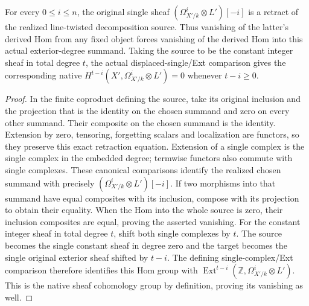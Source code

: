 \begin{lemma}
\label{lem:kn-di-exterior-summand-extraction}
\leanok
{}
For every $0\leq i\leq n$, the original single sheaf
$(\Omega_{X'/k}^i\otimes L')[-i]$ is a retract of the realized
line-twisted decomposition source.  Thus vanishing of the latter's
derived Hom from any fixed object forces vanishing of the derived
Hom into this actual exterior-degree summand.  Taking the source to
be the constant integer sheaf in total degree $t$, the actual
displaced-single/Ext comparison gives the corresponding native
$H^{t-i}(X',\Omega_{X'/k}^i\otimes L')=0$ whenever $t-i\geq0$.
\end{lemma}
\begin{proof}
In the finite coproduct defining the source, take its original
inclusion and the projection that is the identity on the chosen
summand and zero on every other summand.  Their composite on the
chosen summand is the identity.  Extension by zero, tensoring,
forgetting scalars and localization are functors, so they preserve
this exact retraction equation.  Extension of a single complex is
the single complex in the embedded degree; termwise functors also
commute with single complexes.  These canonical comparisons identify
the realized chosen summand with precisely
$(\Omega_{X'/k}^i\otimes L')[-i]$.  If two morphisms into that summand
have equal composites with its inclusion, compose with its
projection to obtain their equality.  When the Hom into the whole
source is zero, their inclusion composites are equal, proving the
asserted vanishing.  For the constant integer sheaf in total degree
$t$, shift both single complexes by $t$.  The source becomes the
single constant sheaf in degree zero and the target becomes the
single original exterior sheaf shifted by $t-i$.  The defining
single-complex/Ext comparison therefore identifies this Hom group
with $\operatorname{Ext}^{t-i}(\mathbb Z,
\Omega_{X'/k}^i\otimes L')$.  This is the native sheaf cohomology
group by definition, proving its vanishing as well.
\end{proof}

